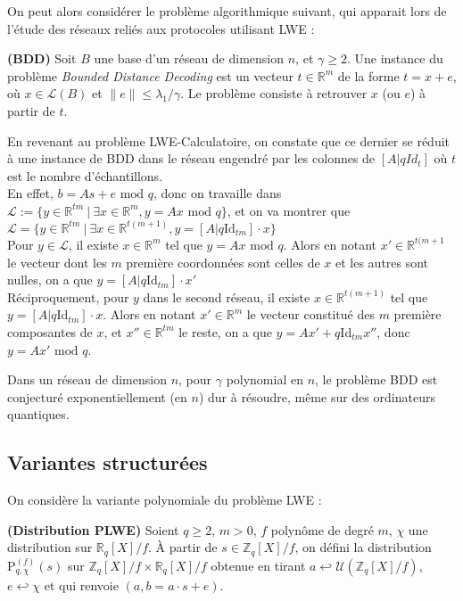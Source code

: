 \documentclass[11pt,a4paper]{article}
\begin{document}
On peut alors considérer le problème algorithmique suivant, qui apparait lors de l'étude des réseaux reliés aux protocoles utilisant LWE : 

\begin{defin}\textbf{(BDD)}
Soit $B$ une base d'un réseau de dimension $n$, et $\gamma \geq 2$. Une instance du problème \textit{Bounded Distance Decoding} est un vecteur $t \in \mathbb{R}^m$ de la forme $t=x+e$, où $x\in \mathcal{L}(B)$ et $\|e\| \leq \lambda_1/\gamma$. Le problème consiste à retrouver $x$ (ou $e$) à partir de $t$.
\end{defin}

En revenant au problème LWE-Calculatoire, on constate que ce dernier se réduit à une instance de BDD dans le réseau engendré par les colonnes de $[A|qId_t]$ où $t$ est le nombre d'échantillons. \\
En effet, $b=As +e \text{ mod } q$, donc on travaille dans $\mathcal{L} := \{y \in \mathbb{R}^{tm} \ | \ \exists x \in \mathbb{R}^m, y=Ax \text{ mod } q \}$, et on va montrer que $\mathcal{L}=\{y \in \mathbb{R}^{tm} \ | \ \exists x \in \mathbb{R}^{t(m+1)}, y=[A|q\text{Id}_{tm}]\cdot x  \}$  \\
Pour $y \in \mathcal{L}$, il existe $x \in \mathbb{R}^m$ tel que $y=Ax \text{ mod } q$. Alors en notant $x' \in \mathbb{R}^{t(m+1}$ le vecteur dont les $m$ première coordonnées sont celles de $x$ et les autres sont nulles, on a que $y=[A|q\text{Id}_{tm}]\cdot x' $\\
Réciproquement, pour $y$ dans le second réseau, il existe $x \in \mathbb{R}^{t(m+1)}$ tel que $y=[A|q\text{Id}_{tm}]\cdot x$. Alors en notant $x'\in \mathbb{R}^m$ le vecteur constitué des $m$ première composantes de $x$, et $x''\in \mathbb{R}^{tm}$ le reste, on a que $y=Ax'+q\text{Id}_{tm}x''$, donc $y = Ax' \text{ mod } q$.
\\

\begin{conj}
Dans un réseau de dimension $n$, pour $\gamma$ polynomial en $n$, le problème BDD est conjecturé exponentiellement (en $n$) dur à résoudre, même sur des ordinateurs quantiques.
\end{conj}

\subsection{Variantes structurées}

On considère la variante polynomiale du problème LWE :
\begin{defin}\textbf{(Distribution PLWE)}
Soient $q \geq 2$, $m>0$, $f$ polynôme de degré $m$, $\chi$ une distribution sur $\mathbb{R}_q[X]/f$. À partir de $s\in \mathbb{Z}_q[X]/f$, on défini la distribution $\text{P}^{(f)}_{q,\chi}(s)$ sur $\mathbb{Z}_q[X]/f \times \mathbb{R}_q[X]/f$ obtenue en tirant $a \hookleftarrow \mathcal{U}(\mathbb{Z}_q[X]/f)$, $e\hookleftarrow \chi$ et qui renvoie $(a,b=a\cdot s+e)$.
\end{defin}
\end{document}
